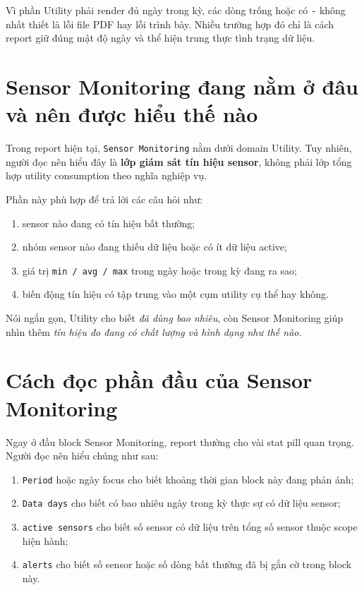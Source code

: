 Vì phần Utility phải render đủ ngày trong kỳ, các dòng trống hoặc có \texttt{-} không nhất thiết là lỗi file PDF hay lỗi trình bày. Nhiều trường hợp đó chỉ là cách report giữ đúng mật độ ngày và thể hiện trung thực tình trạng dữ liệu.

\section{Sensor Monitoring đang nằm ở đâu và nên được hiểu thế nào}

Trong report hiện tại, \texttt{Sensor Monitoring} nằm dưới domain Utility. Tuy nhiên, người đọc nên hiểu đây là \textbf{lớp giám sát tín hiệu sensor}, không phải lớp tổng hợp utility consumption theo nghĩa nghiệp vụ.

Phần này phù hợp để trả lời các câu hỏi như:

\begin{enumerate}[label=-]
\item sensor nào đang có tín hiệu bất thường;
\item nhóm sensor nào đang thiếu dữ liệu hoặc có ít dữ liệu active;
\item giá trị \texttt{min / avg / max} trong ngày hoặc trong kỳ đang ra sao;
\item biến động tín hiệu có tập trung vào một cụm utility cụ thể hay không.
\end{enumerate}

Nói ngắn gọn, Utility cho biết \textit{đã dùng bao nhiêu}, còn Sensor Monitoring giúp nhìn thêm \textit{tín hiệu đo đang có chất lượng và hình dạng như thế nào}.

\section{Cách đọc phần đầu của Sensor Monitoring}

Ngay ở đầu block Sensor Monitoring, report thường cho vài stat pill quan trọng. Người đọc nên hiểu chúng như sau:

\begin{enumerate}[label=-]
\item \texttt{Period} hoặc ngày focus cho biết khoảng thời gian block này đang phản ánh;
\item \texttt{Data days} cho biết có bao nhiêu ngày trong kỳ thực sự có dữ liệu sensor;
\item \texttt{active sensors} cho biết số sensor có dữ liệu trên tổng số sensor thuộc scope hiện hành;
\item \texttt{alerts} cho biết số sensor hoặc số dòng bất thường đã bị gắn cờ trong block này.
\end{enumerate}

